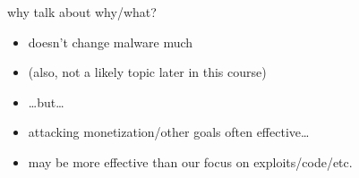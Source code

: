 
\begin{frame}{why talk about why/what?}
    \begin{itemize}
    \item doesn't change malware much
    \item (also, not a likely topic later in this course)
    \item \ldots but\ldots
    \vspace{.5cm}
    \item attacking monetization/other goals often effective\ldots
    \item may be more effective than our focus on exploits/code/etc.
    \end{itemize}
\end{frame}
